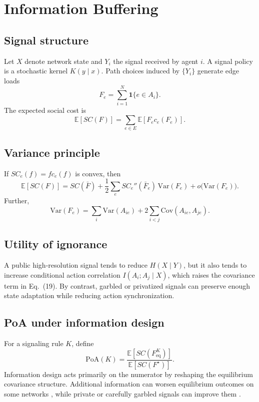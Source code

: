 \documentclass[11pt]{article}
\begin{document}
\section{Information Buffering}
\subsection{Signal structure}
Let $X$ denote network state and $Y_i$ the signal received by agent $i$. A signal policy is a stochastic kernel $K(y\mid x)$. Path choices induced by $\{Y_i\}$ generate edge loads
\begin{equation}
F_e = \sum_{i=1}^{N} \mathbf 1\{e\in A_i\}.
\end{equation}
The expected social cost is
\begin{equation}
\mathbb E[SC(F)] = \sum_{e\in E} \mathbb E[F_e c_e(F_e)].
\end{equation}

\subsection{Variance principle}
If $SC_e(f)=fc_e(f)$ is convex, then
\begin{equation}
\mathbb E[SC(F)] = SC(\bar F) + \frac{1}{2}\sum_e SC_e''(\bar F_e)\,\mathrm{Var}(F_e) + o\bigl(\mathrm{Var}(F_e)\bigr).
\end{equation}
Further,
\begin{equation}
\mathrm{Var}(F_e)=\sum_i \mathrm{Var}(A_{ie}) + 2\sum_{i<j}\mathrm{Cov}(A_{ie},A_{je}).
\end{equation}

\subsection{Utility of ignorance}
A public high-resolution signal tends to reduce $H(X\mid Y)$, but it also tends to increase conditional action correlation $I(A_i;A_j\mid X)$, which raises the covariance term in Eq.~(19). By contrast, garbled or privatized signals can preserve enough state adaptation while reducing action synchronization.

\subsection{PoA under information design}
For a signaling rule $K$, define
\begin{equation}
\mathrm{PoA}(K)=\frac{\mathbb E[SC(F^{K}_{\mathrm{eq}})]}{\mathbb E[SC(F^{\star})]}.
\end{equation}
Information design acts primarily on the numerator by reshaping the equilibrium covariance structure. Additional information can worsen equilibrium outcomes on some networks \cite{Acemoglu2018}, while private or carefully garbled signals can improve them \cite{Das2017}.
\end{document}
